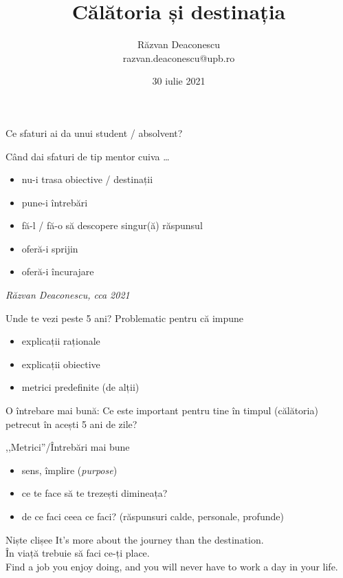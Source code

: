 \documentclass{simple}
\title[Călătoria și destinația]{Călătoria și destinația}
\institute{InfoEducație 2021}
\author[Răzvan Deaconescu]{Răzvan Deaconescu \\
razvan.deaconescu@upb.ro}
\date{30 iulie 2021}
\begin{document}
\frame{\titlepage}

\begin{frame}{}
  \centering
  \LARGE
  Ce sfaturi ai da unui student / absolvent?
\end{frame}

\begin{frame}{}
  Când dai sfaturi de tip mentor cuiva \ldots
  \begin{itemize}
    \pause
    \item nu-i trasa obiective / destinații
    \pause
    \item pune-i întrebări
    \pause
    \item fă-l / fă-o să descopere singur(ă) răspunsul
    \pause
    \item oferă-i sprijin
    \pause
    \item oferă-i încurajare
  \end{itemize}
  \pause
  \hfill \textit{Răzvan Deaconescu, cca 2021} \\
\end{frame}

\begin{frame}{Unde te vezi peste 5 ani?}
  \pause
  Problematic pentru că impune
  \begin{itemize}
    \pause
    \item explicații raționale
    \pause
    \item explicații obiective
    \pause
    \item metrici predefinite (de alții)
  \end{itemize}
  \pause
  O întrebare mai bună: \pause Ce este important pentru tine în timpul (călătoria) petrecut în acești 5 ani de zile?
\end{frame}

\begin{frame}{,,Metrici''/Întrebări mai bune}
  \begin{itemize}
    \pause
    \item sens, împlire (\textit{purpose})
    \pause
    \item ce te face să te trezești dimineața?
    \pause
    \item de ce faci ceea ce faci? (răspunsuri calde, personale, profunde)
  \end{itemize}
\end{frame}

\begin{frame}{Niște clișee}
  \centering
  \LARGE
  \pause
  It's more about the journey than the destination.\\
  \pause
  În viață trebuie să faci ce-ți place.\\
  \pause
  Find a job you enjoy doing, and you will never have to work a day in your life.
\end{frame}
\end{document}
